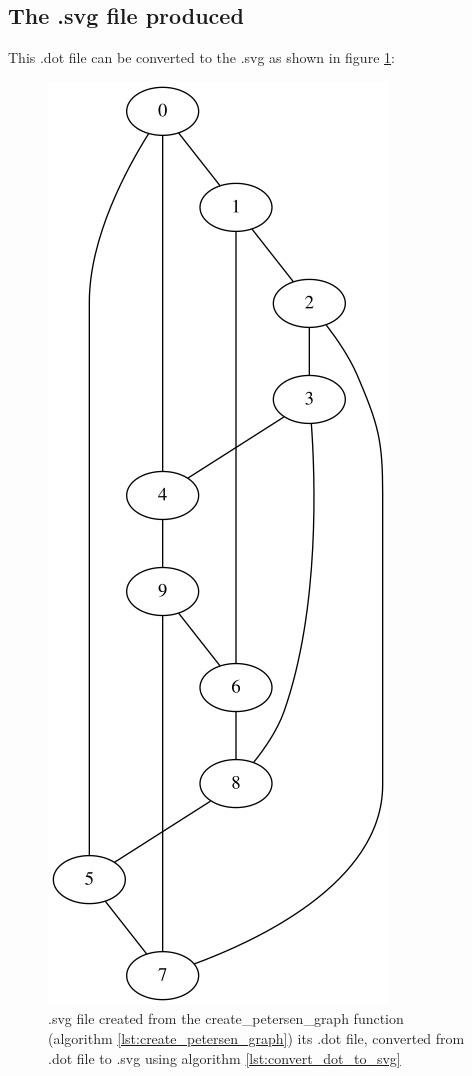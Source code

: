 \subsection{The .svg file produced}
\label{subsec:create_petersen.svg}

This .dot file can be converted to the .svg as shown in figure 
\ref{fig:create_petersen_graph.svg}:

\begin{figure}[!htbp]
  \includegraphics[]{create_petersen_graph.png}
  \caption{
    .svg file created from the create\_petersen\_graph function 
    (algorithm \ref{lst:create_petersen_graph}) its .dot file, 
    converted from .dot file to .svg using algorithm 
    \ref{lst:convert_dot_to_svg}
  }
  \label{fig:create_petersen_graph.svg}
\end{figure}

